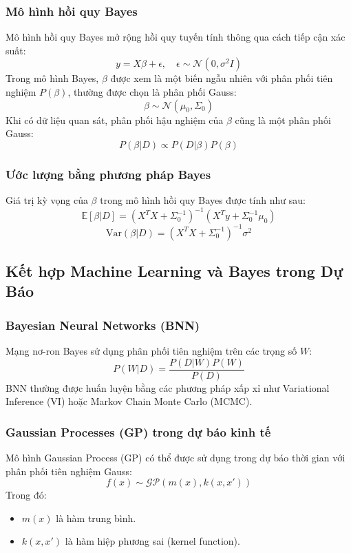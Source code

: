 \subsubsection{Mô hình hồi quy Bayes}
Mô hình hồi quy Bayes mở rộng hồi quy tuyến tính thông qua cách tiếp cận xác suất:
\begin{equation}
    y = X \beta + \epsilon, \quad \epsilon \sim \mathcal{N}(0, \sigma^2 I)
\end{equation}
Trong mô hình Bayes, $\beta$ được xem là một biến ngẫu nhiên với phân phối tiên nghiệm $P(\beta)$, thường được chọn là phân phối Gauss:
\begin{equation}
    \beta \sim \mathcal{N}(\mu_0, \Sigma_0)
\end{equation}
Khi có dữ liệu quan sát, phân phối hậu nghiệm của $\beta$ cũng là một phân phối Gauss:
\begin{equation}
    P(\beta | D) \propto P(D | \beta) P(\beta)
\end{equation}

\subsubsection{Ước lượng bằng phương pháp Bayes}
Giá trị kỳ vọng của $\beta$ trong mô hình hồi quy Bayes được tính như sau:
\begin{equation}
    \mathbb{E}[\beta | D] = (X^TX + \Sigma_0^{-1})^{-1} (X^T y + \Sigma_0^{-1} \mu_0)
\end{equation}
\begin{equation}
    \text{Var}(\beta | D) = (X^TX + \Sigma_0^{-1})^{-1} \sigma^2
\end{equation}

\subsection{Kết hợp Machine Learning và Bayes trong Dự Báo}
\subsubsection{Bayesian Neural Networks (BNN)}
Mạng nơ-ron Bayes sử dụng phân phối tiên nghiệm trên các trọng số $W$:
\begin{equation}
    P(W | D) = \frac{P(D | W) P(W)}{P(D)}
\end{equation}
BNN thường được huấn luyện bằng các phương pháp xấp xỉ như Variational Inference (VI) hoặc Markov Chain Monte Carlo (MCMC).

\subsubsection{Gaussian Processes (GP) trong dự báo kinh tế}
Mô hình Gaussian Process (GP) có thể được sử dụng trong dự báo thời gian với phân phối tiên nghiệm Gauss:
\begin{equation}
    f(x) \sim \mathcal{GP}(m(x), k(x, x'))
\end{equation}
Trong đó:
\begin{itemize}
    \item $m(x)$ là hàm trung bình.
    \item $k(x, x')$ là hàm hiệp phương sai (kernel function).
\end{itemize}

